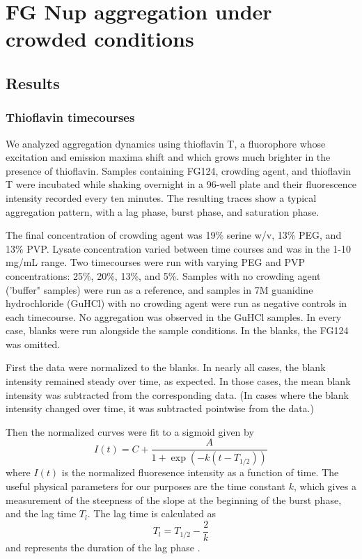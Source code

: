 \chapter{FG Nup aggregation under crowded conditions}\label{ch05}

\section{Results}
\subsection{Thioflavin timecourses}

We analyzed aggregation dynamics using thioflavin T, a fluorophore whose excitation and emission maxima shift and which grows much brighter in the presence of thioflavin.  Samples containing FG124, crowding agent, and thioflavin T were incubated while shaking overnight in a 96-well plate and their fluorescence intensity recorded every ten minutes.  The resulting traces show a typical aggregation pattern, with a lag phase, burst phase, and saturation phase.

The final concentration of crowding agent was 19\% serine w/v, 13\% PEG, and 13\% PVP.  Lysate concentration varied between time courses and was in the 1-10 mg/mL range.  Two timecourses were run with varying PEG and PVP concentrations: 25\%, 20\%, 13\%, and 5\%.  Samples with no crowding agent ('buffer" samples) were run as a reference, and samples in 7M guanidine hydrochloride (GuHCl) with no crowding agent were run as negative controls in each timecourse.  No aggregation was observed in the GuHCl samples.  In every case, blanks were run alongside the sample conditions.  In the blanks, the FG124 was omitted.

First the data were normalized to the blanks.  In nearly all cases, the blank intensity remained steady over time, as expected.  In those cases, the mean blank intensity was subtracted from the corresponding data.  (In cases where the blank intensity changed over time, it was subtracted pointwise from the data.)

Then the normalized curves were fit to a sigmoid given by
\begin{equation}
I(t) = C + \frac{A}{1+\exp \left(-k(t-T_{1/2})\right)}
\label{eq:fit}
\end{equation}
where $I(t)$ is the normalized fluoresence intensity as a function of time.  The useful physical parameters for our purposes are the time constant $k$, which gives a measurement of the steepness of the slope at the beginning of the burst phase, and the lag time $T_l$.  The lag time is calculated as
\begin{equation}
T_l = T_{1/2} - \frac{2}{k}
\end{equation}
and represents the duration of the lag phase \cite{}.  

